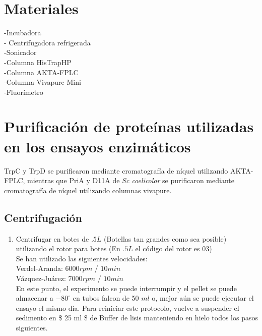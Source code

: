 \documentclass[12pt,twoside]{reedthesis}
\providecommand{\tightlist}{%
  \setlength{\itemsep}{0pt}\setlength{\parskip}{0pt}}
\begin{document}
  \section{Materiales}\label{materiales}
  
  -Incubadora\\
  - Centrifugadora refrigerada\\
  -Sonicador\\
  -Columna HisTrapHP\\
  -Columna AKTA-FPLC\\
  -Columna Vivapure Mini\\
  -Fluorímetro
  
  \section{Purificación de proteínas utilizadas en los ensayos
  enzimáticos}\label{purificacion-de-proteinas-utilizadas-en-los-ensayos-enzimaticos}
  
  TrpC y TrpD se purificaron mediante cromatografía de níquel utilizando
  AKTA-FPLC, mientras que PriA y D11A de \emph{Sc coelicolor} se
  purificaron mediante cromatografía de níquel utilizando columnas
  vivapure.
  
  \subsection{Centrifugación}\label{centrifugacion}
  
  \begin{enumerate}
  \def\labelenumi{\arabic{enumi}.}
  \tightlist
  \item
    Centrifugar en botes de \(.5L\) (Botellas tan grandes como sea
    posible)\\
    utilizando el rotor para botes (En \(.5L\) el código del rotor es
    03)\\
    Se han utilizado las siguientes velocidades:\\
    Verdel-Aranda: \(6000 rpm\) / \(10 min\)\\
    Vázquez-Juárez: \(7000rpm\) / \(10 min\)\\
    En este punto, el experimento se puede interrumpir y el pellet se
    puede almacenar a \(-80^{\circ}\) en tubos falcon de 50 \(ml\) o,
    mejor aún se puede ejecutar el ensayo el mismo día. Para reiniciar
    este protocolo, vuelve a suspender el sedimento en \$ 25 ml \$ de
    Buffer de lisis manteniendo en hielo todos los pasos siguientes.
  \end{enumerate}
  
\end{document}
